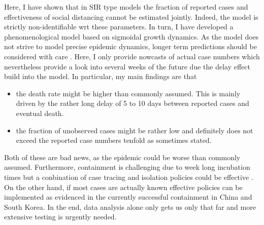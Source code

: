 \documentclass[a4paper]{tufte-handout}
\begin{document}
Here, I have shown that in SIR type models the fraction of reported
cases and effectiveness of social distancing cannot be estimated
jointly. Indeed, the model is strictly non-identifiable wrt these
parameters. In turn, I have developed a phenomenological model based
on sigmoidal growth dynamics. As the model does not strive to model
precise epidemic dynamics, longer term predictions should be
considered with care
\cite{https://doi.org/10.1101/2020.03.12.20034595}. Here, I only
provide nowcasts of actual case numbers which nevertheless provide a
look into several weeks of the future due the delay effect build into
the model. In particular, my main findings are that
\begin{itemize}
\item the death rate might be higher than commonly assumed. This is
  mainly driven by the rather long delay of 5 to 10 days between
  reported cases and eventual death.
\item the fraction of unobserved cases might be rather low and
  definitely does not exceed the reported case numbers tenfold as
  sometimes stated.
\end{itemize}
Both of these are bad news, as the epidemic could be worse than
commonly assumed. Furthermore, containment is challenging due to week
long incubation times
\cite{https://doi.org/10.1101/2020.03.25.20043109} but a conbination
of case tracing and isolation policies could be effective
\cite{fraser04,kubinec}. On the other hand, if most cases are actually
known effective policies can be implemented as evidenced in the
currently successful containment in China and South Korea. In the end,
data analysis alone only gets us only that far and more extensive
testing is urgently needed.


\end{document}
